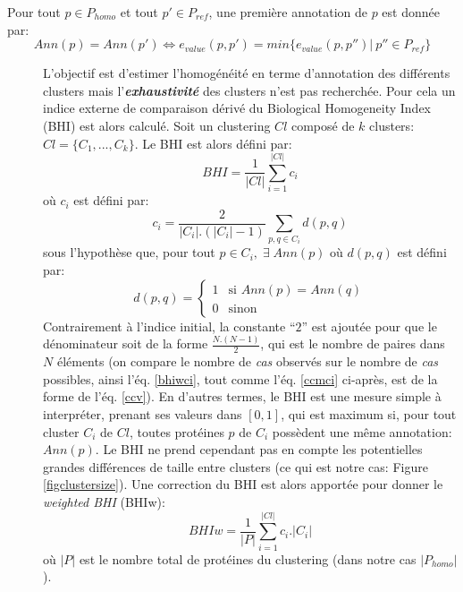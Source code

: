 \begin{description}
 Pour tout $p \in P_{homo}$ et tout $p' \in P_{ref}$, une première annotation de $p$ est donnée par:
      \begin{equation}\label{eqannot}
      Ann(p)=Ann(p') \iff e_{value}(p,p')=min\{e_{value}(p,p'')| \: p'' \in P_{ref}\}
      \end{equation}
\begin{description}
 \item[\textbullet] L'objectif est d'estimer l'homogénéité en terme d'annotation des différents clusters mais l'\textbf{\textit{exhaustivité}} des clusters n'est pas recherchée. Pour cela un indice externe de comparaison dérivé du Biological Homogeneity Index (BHI) \citep{Datta2006} est alors calculé. Soit un clustering $Cl$ composé de $k$ clusters: $Cl=\{C_{1},...,C_{k}\}$. Le BHI est alors défini par:
	\begin{equation}
      	BHI=\frac{1}{|Cl|}\sum_{i=1}^{|Cl|}c_{i}
      \end{equation}
où $c_{i}$ est défini par:
      \begin{equation}\label{bhiwci}
      	c_{i}=\frac{2}{|C_{i}|.(|C_{i}|-1)}\sum_{p,q \in C_{i}}d(p,q)
      \end{equation}
sous l'hypothèse que, pour tout $p \in C_{i}, \; \exists \; Ann(p)$ où $d(p,q)$ est défini par:
      $$d(p,q) = 
      \begin{cases}
       1 & \text{si } Ann(p)=Ann(q)\\
       0 & \text{sinon }
      \end{cases}
      $$
Contrairement à l'indice initial, la constante “$2$” est ajoutée pour que le dénominateur soit de la forme $\frac{N.(N-1)}{2}$, qui est le nombre de paires dans $N$ éléments (on compare le nombre de \textit{cas} observés sur le nombre de \textit{cas} possibles, ainsi l'éq. \ref{bhiwci}, tout comme l'éq. \ref{ccmci} ci-après, est de la forme de l'éq. \ref{ccv}). En d'autres termes, le BHI est une mesure simple à interpréter, prenant ses valeurs dans $[0,1]$, qui est maximum si, pour tout cluster $C_{i}$ de $Cl$, toutes protéines $p$ de $C_{i}$ possèdent une même annotation: $Ann(p)$. Le BHI ne prend cependant pas en compte les potentielles grandes différences de taille entre clusters (ce qui est notre cas: Figure \ref{figclustersize}). Une correction du BHI est alors apportée pour donner le \textit{weighted BHI} (BHIw): 
	\begin{equation}\label{bhiw}
		BHIw=\frac{1}{|P|}\sum_{i=1}^{|Cl|}c_{i}.|C_{i}|
	\end{equation}
où $|P|$ est le nombre total de protéines du clustering (dans notre cas $|P_{homo}|$). 


\end{description}
\end{description}
